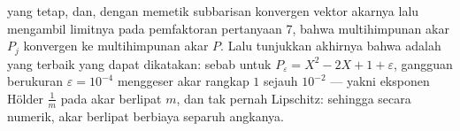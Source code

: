 \begin{problem}
\begin{enumerate}[resume]
         yang tetap, dan, dengan memetik subbarisan
        konvergen vektor akarnya lalu mengambil
        limitnya pada pemfaktoran pertanyaan 7, bahwa
        multihimpunan akar $P_j$ konvergen ke multihimpunan akar $P$.
        Lalu tunjukkan akhirnya bahwa  adalah yang terbaik yang dapat
        dikatakan: sebab untuk $P_\varepsilon = X^2 - 2X + 1 +
        \varepsilon$, gangguan berukuran $\varepsilon =
        10^{-4}$ menggeser akar rangkap $1$ sejauh $10^{-2}$ ---
        yakni eksponen Hölder $\frac1m$ pada akar berlipat $m$,
        dan tak pernah Lipschitz: sehingga secara numerik, akar berlipat berbiaya
        separuh angkanya.

\end{enumerate}
\end{problem}
